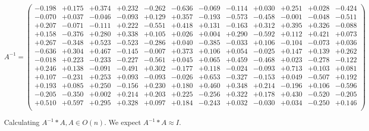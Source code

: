 \documentclass[9pt]{article}
\theoremstyle{plain}
\theoremstyle{definition}
\theoremstyle{remark}
\numberwithin{equation}{section}
\begin{document}
$A^{-1} = \left(
\begin{array}{
cccccccccccc}
-0.198 & +0.175 & +0.374 & +0.232 & -0.262 & -0.636 & -0.069 & -0.114 & +0.030 & +0.251 & +0.028 & -0.424 \\
-0.070 & +0.037 & -0.046 & -0.093 & +0.129 & +0.357 & -0.193 & -0.573 & -0.458 & -0.001 & -0.048 & -0.511 \\
+0.207 & -0.071 & -0.111 & +0.222 & -0.551 & +0.418 & +0.131 & -0.163 & +0.312 & +0.395 & +0.326 & -0.088 \\
+0.158 & -0.376 & +0.280 & +0.338 & +0.105 & +0.026 & +0.004 & +0.290 & -0.592 & +0.112 & +0.421 & +0.073 \\
+0.267 & -0.348 & +0.523 & -0.523 & -0.286 & +0.040 & -0.385 & -0.033 & +0.106 & -0.104 & -0.073 & +0.036 \\
-0.636 & +0.304 & +0.467 & -0.145 & -0.007 & +0.373 & +0.106 & +0.054 & -0.025 & +0.147 & +0.139 & +0.262 \\
-0.018 & +0.223 & -0.233 & -0.227 & -0.561 & +0.045 & +0.065 & +0.459 & -0.468 & +0.023 & -0.278 & -0.122 \\
+0.246 & +0.138 & -0.091 & -0.491 & +0.302 & -0.177 & +0.118 & -0.024 & -0.093 & +0.713 & +0.103 & +0.081 \\
+0.107 & -0.231 & +0.253 & +0.093 & -0.093 & -0.026 & +0.653 & -0.327 & -0.153 & +0.049 & -0.507 & +0.192 \\
+0.193 & +0.085 & +0.250 & -0.156 & +0.230 & +0.180 & +0.460 & +0.348 & +0.214 & -0.196 & +0.106 & -0.596 \\
-0.205 & -0.350 & +0.002 & +0.214 & +0.203 & +0.225 & -0.256 & +0.322 & +0.178 & +0.430 & -0.520 & -0.205 \\
+0.510 & +0.597 & +0.295 & +0.328 & +0.097 & +0.184 & -0.243 & +0.032 & -0.030 & +0.034 & -0.250 & +0.146 \\
\end{array}
\right)$ \newline 

Calculating $A^{-1} *A  ,  A \in O(n)$.   We expect $A^{-1} *A  \approx I$. 
\end{document}
